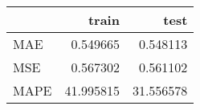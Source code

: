 \begin{tabular}{lrr}
\toprule
{} &      train &       test \\
\midrule
MAE  &   0.549665 &   0.548113 \\
MSE  &   0.567302 &   0.561102 \\
MAPE &  41.995815 &  31.556578 \\
\bottomrule
\end{tabular}
